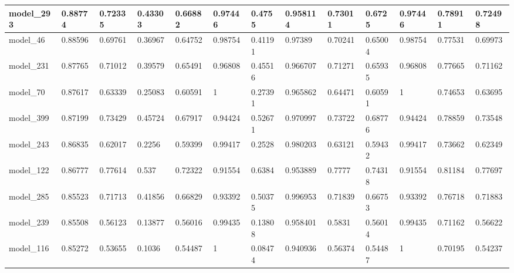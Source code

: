 \begin{tabular}{|l|l|l|l|l|l|l|l|l|l|l|l|l|}
model\_293     & 0.88774     & 0.72335        & 0.43303      & 0.66882          & 0.97446              & 0.4755               & 0.958114     & 0.73011           & 0.6725             & 0.97446         & 0.78911     & 0.72498      \\ \hline
model\_46      & 0.88596     & 0.69761        & 0.36967      & 0.64752          & 0.98754              & 0.41191              & 0.97389      & 0.70241           & 0.65004            & 0.98754         & 0.77531     & 0.69973      \\ \hline
model\_231     & 0.87765     & 0.71012        & 0.39579      & 0.65491          & 0.96808              & 0.45516              & 0.966707     & 0.71271           & 0.65935            & 0.96808         & 0.77665     & 0.71162      \\ \hline
model\_70      & 0.87617     & 0.63339        & 0.25083      & 0.60591          & 1                    & 0.27391              & 0.965862     & 0.64471           & 0.60591            & 1               & 0.74653     & 0.63695      \\ \hline
model\_399     & 0.87199     & 0.73429        & 0.45724      & 0.67917          & 0.94424              & 0.52671              & 0.970997     & 0.73722           & 0.68776            & 0.94424         & 0.78859     & 0.73548      \\ \hline
model\_243     & 0.86835     & 0.62017        & 0.2256       & 0.59399          & 0.99417              & 0.2528               & 0.980203     & 0.63121           & 0.59432            & 0.99417         & 0.73662     & 0.62349      \\ \hline
model\_122     & 0.86777     & 0.77614        & 0.537        & 0.72322          & 0.91554              & 0.6384               & 0.953889     & 0.7777            & 0.74318            & 0.91554         & 0.81184     & 0.77697      \\ \hline
model\_285     & 0.85523     & 0.71713        & 0.41856      & 0.66829          & 0.93392              & 0.50375              & 0.996953     & 0.71839           & 0.66753            & 0.93392         & 0.76718     & 0.71883      \\ \hline
model\_239     & 0.85508     & 0.56123        & 0.13877      & 0.56016          & 0.99435              & 0.13808              & 0.958401     & 0.5831            & 0.56014            & 0.99435         & 0.71162     & 0.56622      \\ \hline
model\_116     & 0.85272     & 0.53655        & 0.1036       & 0.54487          & 1                    & 0.08474              & 0.940936     & 0.56374           & 0.54487            & 1               & 0.70195     & 0.54237      \\ \hline

\end{tabular}
